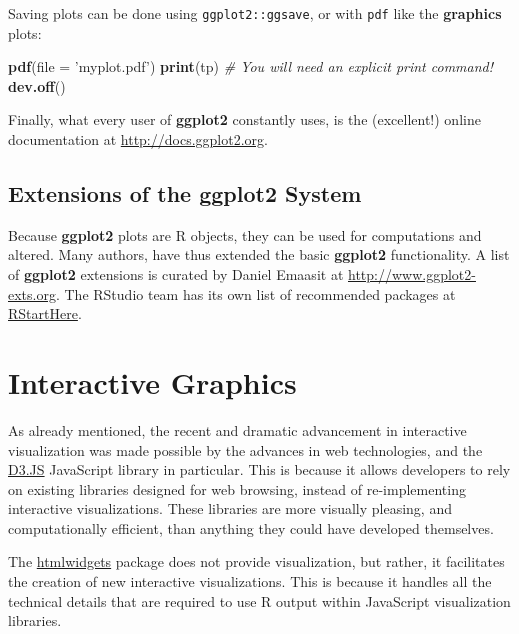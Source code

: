 \documentclass[]{book}
\newenvironment{Shaded}{\begin{snugshade}}{\end{snugshade}}
\newcommand{\KeywordTok}[1]{\textcolor[rgb]{0.13,0.29,0.53}{\textbf{#1}}}
\newcommand{\DataTypeTok}[1]{\textcolor[rgb]{0.13,0.29,0.53}{#1}}
\newcommand{\StringTok}[1]{\textcolor[rgb]{0.31,0.60,0.02}{#1}}
\newcommand{\CommentTok}[1]{\textcolor[rgb]{0.56,0.35,0.01}{\textit{#1}}}
\newcommand{\NormalTok}[1]{#1}
\theoremstyle{definition}
\theoremstyle{definition}
\theoremstyle{definition}
\theoremstyle{remark}
\begin{document}
Saving plots can be done using \texttt{ggplot2::ggsave}, or with
\texttt{pdf} like the \textbf{graphics} plots:

\begin{Shaded}
\begin{Highlighting}[]
\KeywordTok{pdf}\NormalTok{(}\DataTypeTok{file =} \StringTok{'myplot.pdf'}\NormalTok{)}
\KeywordTok{print}\NormalTok{(tp) }\CommentTok{# You will need an explicit print command!}
\KeywordTok{dev.off}\NormalTok{()}
\end{Highlighting}
\end{Shaded}

Finally, what every user of \textbf{ggplot2} constantly uses, is the
(excellent!) online documentation at \url{http://docs.ggplot2.org}.

\subsection{Extensions of the ggplot2
System}\label{extensions-of-the-ggplot2-system}

Because \textbf{ggplot2} plots are R objects, they can be used for
computations and altered. Many authors, have thus extended the basic
\textbf{ggplot2} functionality. A list of \textbf{ggplot2} extensions is
curated by Daniel Emaasit at
\href{http://www.ggplot2-exts.org/gallery/}{http://www.ggplot2-exts.org}.
The RStudio team has its own list of recommended packages at
\href{https://github.com/rstudio/RStartHere}{RStartHere}.

\section{Interactive Graphics}\label{interactive-graphics}

As already mentioned, the recent and dramatic advancement in interactive
visualization was made possible by the advances in web technologies, and
the \href{https://d3js.org/}{D3.JS} JavaScript library in particular.
This is because it allows developers to rely on existing libraries
designed for web browsing, instead of re-implementing interactive
visualizations. These libraries are more visually pleasing, and
computationally efficient, than anything they could have developed
themselves.

The \href{http://www.htmlwidgets.org/}{htmlwidgets} package does not
provide visualization, but rather, it facilitates the creation of new
interactive visualizations. This is because it handles all the technical
details that are required to use R output within JavaScript
visualization libraries.
\end{document}
